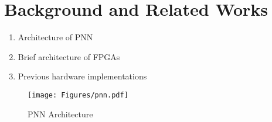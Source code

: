 \section{Background and Related Works}
\label{sec_related}

\begin{enumerate}
\item Architecture of PNN
\item Brief architecture of FPGAs
\item Previous hardware implementations
\end{enumerate}

\begin{figure}[t]
\centering
   \texttt{[image: Figures/pnn.pdf]}
   \label{fig:pnn}
   \caption{PNN Architecture}
\end{figure}